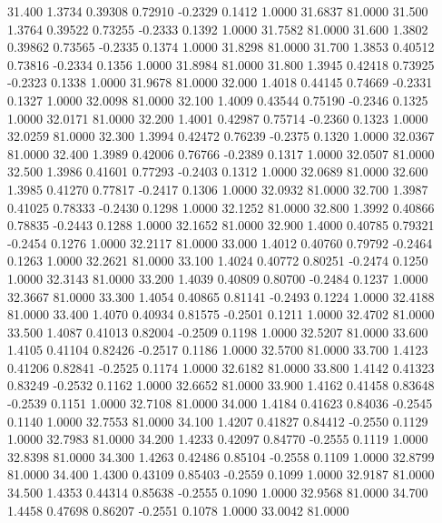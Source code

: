   31.400   1.3734   0.39308   0.72910  -0.2329   0.1412   1.0000  31.6837  81.0000
  31.500   1.3764   0.39522   0.73255  -0.2333   0.1392   1.0000  31.7582  81.0000
  31.600   1.3802   0.39862   0.73565  -0.2335   0.1374   1.0000  31.8298  81.0000
  31.700   1.3853   0.40512   0.73816  -0.2334   0.1356   1.0000  31.8984  81.0000
  31.800   1.3945   0.42418   0.73925  -0.2323   0.1338   1.0000  31.9678  81.0000
  32.000   1.4018   0.44145   0.74669  -0.2331   0.1327   1.0000  32.0098  81.0000
  32.100   1.4009   0.43544   0.75190  -0.2346   0.1325   1.0000  32.0171  81.0000
  32.200   1.4001   0.42987   0.75714  -0.2360   0.1323   1.0000  32.0259  81.0000
  32.300   1.3994   0.42472   0.76239  -0.2375   0.1320   1.0000  32.0367  81.0000
  32.400   1.3989   0.42006   0.76766  -0.2389   0.1317   1.0000  32.0507  81.0000
  32.500   1.3986   0.41601   0.77293  -0.2403   0.1312   1.0000  32.0689  81.0000
  32.600   1.3985   0.41270   0.77817  -0.2417   0.1306   1.0000  32.0932  81.0000
  32.700   1.3987   0.41025   0.78333  -0.2430   0.1298   1.0000  32.1252  81.0000
  32.800   1.3992   0.40866   0.78835  -0.2443   0.1288   1.0000  32.1652  81.0000
  32.900   1.4000   0.40785   0.79321  -0.2454   0.1276   1.0000  32.2117  81.0000
  33.000   1.4012   0.40760   0.79792  -0.2464   0.1263   1.0000  32.2621  81.0000
  33.100   1.4024   0.40772   0.80251  -0.2474   0.1250   1.0000  32.3143  81.0000
  33.200   1.4039   0.40809   0.80700  -0.2484   0.1237   1.0000  32.3667  81.0000
  33.300   1.4054   0.40865   0.81141  -0.2493   0.1224   1.0000  32.4188  81.0000
  33.400   1.4070   0.40934   0.81575  -0.2501   0.1211   1.0000  32.4702  81.0000
  33.500   1.4087   0.41013   0.82004  -0.2509   0.1198   1.0000  32.5207  81.0000
  33.600   1.4105   0.41104   0.82426  -0.2517   0.1186   1.0000  32.5700  81.0000
  33.700   1.4123   0.41206   0.82841  -0.2525   0.1174   1.0000  32.6182  81.0000
  33.800   1.4142   0.41323   0.83249  -0.2532   0.1162   1.0000  32.6652  81.0000
  33.900   1.4162   0.41458   0.83648  -0.2539   0.1151   1.0000  32.7108  81.0000
  34.000   1.4184   0.41623   0.84036  -0.2545   0.1140   1.0000  32.7553  81.0000
  34.100   1.4207   0.41827   0.84412  -0.2550   0.1129   1.0000  32.7983  81.0000
  34.200   1.4233   0.42097   0.84770  -0.2555   0.1119   1.0000  32.8398  81.0000
  34.300   1.4263   0.42486   0.85104  -0.2558   0.1109   1.0000  32.8799  81.0000
  34.400   1.4300   0.43109   0.85403  -0.2559   0.1099   1.0000  32.9187  81.0000
  34.500   1.4353   0.44314   0.85638  -0.2555   0.1090   1.0000  32.9568  81.0000
  34.700   1.4458   0.47698   0.86207  -0.2551   0.1078   1.0000  33.0042  81.0000

